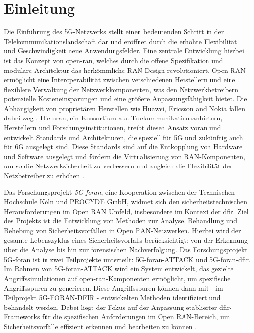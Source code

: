 \chapter{Einleitung}
\label{chap:Einleitung}

\par
Die Einführung des 5G-Netzwerks stellt einen bedeutenden Schritt in der Telekommunikationslandschaft dar und eröffnet durch die erhöhte Flexibilität und Geschwindigkeit neue Anwendungsfelder. Eine zentrale Entwicklung hierbei ist das Konzept von \gls{open-ran}, welches durch die offene Spezifikation und modulare Architektur das herkömmliche RAN-Design revolutioniert. Open RAN ermöglicht eine Interoperabilität zwischen verschiedenen Herstellern und eine flexiblere Verwaltung der Netzwerkkomponenten, was den Netzwerkbetreibern potenzielle Kosteneinsparungen und eine größere Anpassungsfähigkeit bietet. Die Abhängigkeit von proprietären Herstellen wie Huawei, Ericsson and Nokia fallen dabei weg \cite{NokiaEricssonUnd}. Die \gls{oran}, ein Konsortium aus Telekommunikationsanbietern, Herstellern und Forschungsinstitutionen, treibt diesen Ansatz voran und entwickelt Standards und Architekturen, die speziell für 5G und zukünftig auch für 6G ausgelegt sind. Diese Standards sind auf die Entkopplung von Hardware und Software ausgelegt und fördern die Virtualisierung von RAN-Komponenten, um so die Netzwerksicherheit zu verbessern und zugleich die Flexibilität der Netzbetreiber zu erhöhen \cite{5GFORAN}.

\par
Das Forschungsprojekt \textit{5G-\gls{foran}}, eine Kooperation zwischen der Technischen Hochschule Köln und PROCYDE GmbH, widmet sich den sicherheitstechnischen Herausforderungen im Open RAN Umfeld, insbesondere im Kontext der \gls{dfir}. Ziel des Projekts ist die Entwicklung von Methoden zur Analyse, Behandlung und Behebung von Sicherheitsvorfällen in Open RAN-Netzwerken. Hierbei wird der gesamte Lebenszyklus eines Sicherheitsvorfalls berücksichtigt: von der Erkennung über die Analyse bis hin zur forensischen Nachverfolgung.
Das Forschungsprojekt 5G-\gls{foran} ist in zwei Teilprojekte unterteilt: 5G-\gls{foran}-ATTACK und 5G-\gls{foran}-\gls{dfir}. Im Rahmen von 5G-\gls{foran}-ATTACK wird ein System entwickelt, das gezielte Angriffssimulationen auf \gls{open-ran}-Komponenten ermöglicht, um spezifische Angriffsspuren zu generieren. Diese Angriffsspuren können dann mit - im Teilprojekt 5G-FORAN-DFIR - entwickelten Methoden identifiziert und behandelt werden. Dabei liegt der Fokus auf der Anpassung etablierter \gls{dfir}-Frameworks für die spezifischen Anforderungen im Open RAN-Bereich, um Sicherheitsvorfälle effizient erkennen und bearbeiten zu können \cite{5GFORAN}.


